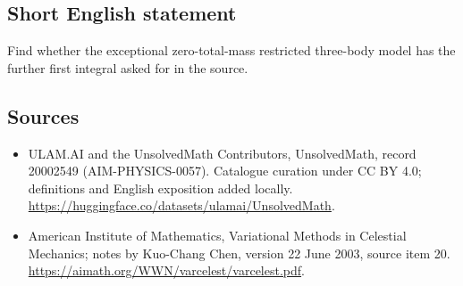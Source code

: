 \documentclass[11pt]{article}
\begin{document}
\subsection{Short English statement}
Find whether the exceptional zero-total-mass restricted three-body model has the further first integral asked for in the source.
\subsection{Sources}
\begin{itemize}
\item[\hypertarget{source:20002549:1}{S1}] ULAM.AI and the UnsolvedMath Contributors, UnsolvedMath, record 20002549 (AIM-PHYSICS-0057). Catalogue curation under CC BY 4.0; definitions and English exposition added locally.
\url{https://huggingface.co/datasets/ulamai/UnsolvedMath}.
\item[\hypertarget{source:20002549:2}{S2}] American Institute of Mathematics, Variational Methods in Celestial Mechanics; notes by Kuo-Chang Chen, version 22 June 2003, source item 20.
\url{https://aimath.org/WWN/varcelest/varcelest.pdf}.
\end{itemize}
\label{end:20002549}
\end{document}
